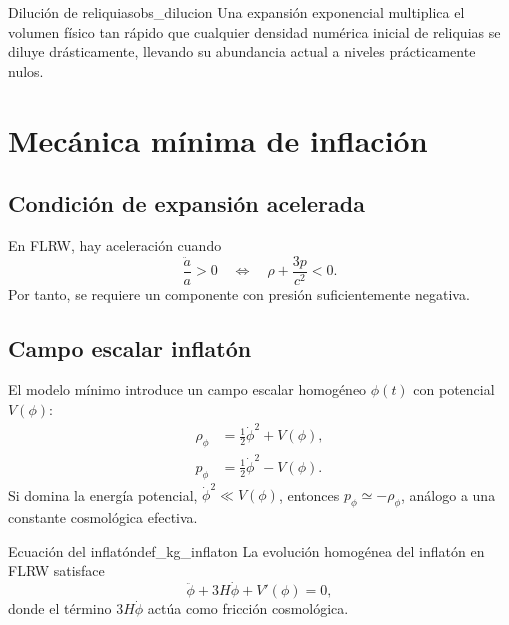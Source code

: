 \begin{observacion}{Dilución de reliquias}{obs_dilucion}
Una expansión exponencial multiplica el volumen físico tan rápido que cualquier densidad numérica inicial de reliquias se diluye drásticamente, llevando su abundancia actual a niveles prácticamente nulos.
\end{observacion}

\section{Mecánica mínima de inflación}
\label{sec:mecanica_inflacion}

\subsection{Condición de expansión acelerada}

En FLRW, hay aceleración cuando
\begin{equation}
  \frac{\ddot a}{a}>0
  \quad\Longleftrightarrow\quad
  \rho + \frac{3p}{c^2}<0.
\end{equation}
Por tanto, se requiere un componente con presión suficientemente negativa.

\subsection{Campo escalar inflatón}

El modelo mínimo introduce un campo escalar homogéneo $\phi(t)$ con potencial $V(\phi)$:
\begin{align}
  \rho_\phi &= \frac{1}{2}\dot\phi^2 + V(\phi),\\
  p_\phi &= \frac{1}{2}\dot\phi^2 - V(\phi).
\end{align}
Si domina la energía potencial, $\dot\phi^2 \ll V(\phi)$, entonces $p_\phi \simeq -\rho_\phi$, análogo a una constante cosmológica efectiva.

\begin{definicion}{Ecuación del inflatón}{def_kg_inflaton}
La evolución homogénea del inflatón en FLRW satisface
\begin{equation}
  \ddot\phi + 3H\dot\phi + V'(\phi)=0,
  \label{eq:kg_inflaton}
\end{equation}
donde el término $3H\dot\phi$ actúa como fricción cosmológica.
\end{definicion}

